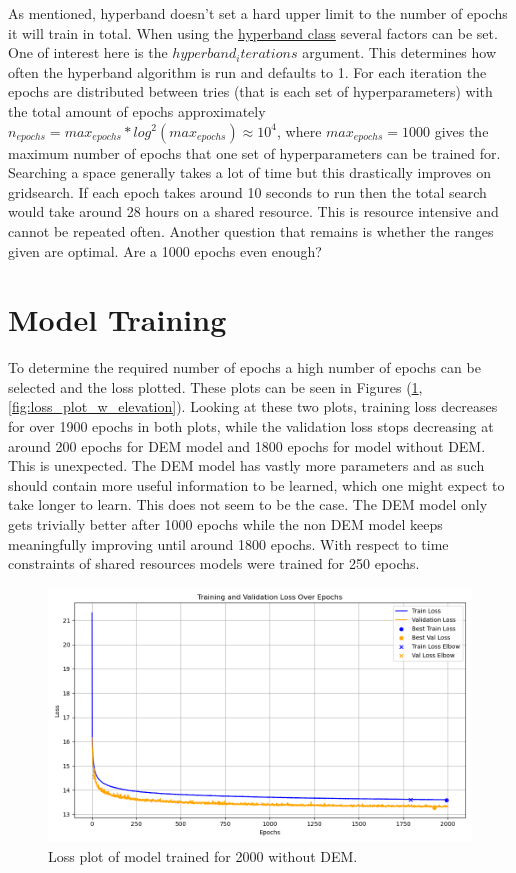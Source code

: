 As mentioned, hyperband doesn't set a hard upper limit to the number of epochs it will train in total. When using the \href{https://keras.io/api/keras_tuner/tuners/hyperband/}{hyperband class} several factors can be set. One of interest here is the $hyperband_iterations$ argument. This determines how often the hyperband algorithm is run and defaults to 1. For each iteration the epochs are distributed between tries (that is each set of hyperparameters) with the total amount of epochs approximately $n_{epochs} = max_{epochs} * log^2(max_{epochs})\approx 10^4$, where $max_{epochs} = 1000$ gives the maximum number of epochs that one set of hyperparameters can be trained for. Searching a space generally takes a lot of time but this drastically improves on gridsearch. If each epoch takes around 10 seconds to run then the total search would take around 28 hours on a shared resource. This is resource intensive and cannot be repeated often. Another question that remains is whether the ranges given are optimal. Are a 1000 epochs even enough?

\section{Model Training}
To determine the required number of epochs a high number of epochs can be selected and the loss plotted. These plots can be seen in Figures (\ref{fig:loss_plot_wo_elevation}, \ref{fig:loss_plot_w_elevation}). Looking at these two plots, training loss decreases for over 1900 epochs in both plots, while the validation loss stops decreasing at around 200 epochs for DEM model and 1800 epochs for model without DEM. This is unexpected. The DEM model has vastly more parameters and as such should contain more useful information to be learned, which one might expect to take longer to learn. This does not seem to be the case. The DEM model only gets trivially better after 1000 epochs while the non DEM model keeps meaningfully improving until around 1800 epochs. With respect to time constraints of shared resources models were trained for 250 epochs.

\begin{figure}
    \centering
    \includegraphics[scale = 0.6]{Figures/loss_plot_wo_elevation.png}
    \caption[Loss plot of model trained for 2000 without DEM.]{Loss plot of model trained for 2000 without DEM.}
    \label{fig:loss_plot_wo_elevation}
\end{figure}



